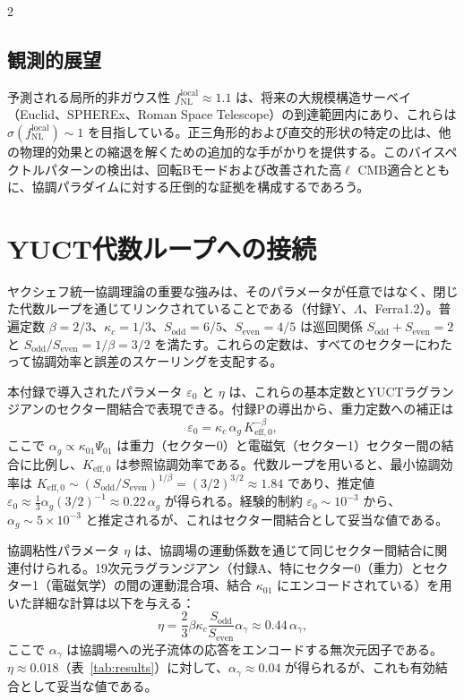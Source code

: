 \documentclass[11pt,a4paper]{article}
\begin{document}
\begin{multicols}{2}
		\subsection{観測的展望}
		予測される局所的非ガウス性 \(f_{\mathrm{NL}}^{\mathrm{local}} \approx 1.1\) は、将来の大規模構造サーベイ（Euclid、SPHEREx、Roman Space Telescope）の到達範囲内にあり、これらは \(\sigma(f_{\mathrm{NL}}^{\mathrm{local}}) \sim 1\) を目指している。正三角形的および直交的形状の特定の比は、他の物理的効果との縮退を解くための追加的な手がかりを提供する。このバイスペクトルパターンの検出は、回転Bモードおよび改善された高\(\ell\) CMB適合とともに、協調パラダイムに対する圧倒的な証拠を構成するであろう。
		
		\section{YUCT代数ループへの接続}
		\label{sec:algebraic}
		
		ヤクシェフ統一協調理論の重要な強みは、そのパラメータが任意ではなく、閉じた代数ループを通じてリンクされていることである（付録Y、\(\Lambda\)、Ferra1.2）。普遍定数 \(\beta=2/3\)、\(\kappa_c=1/3\)、\(S_{\mathrm{odd}}=6/5\)、\(S_{\mathrm{even}}=4/5\) は巡回関係 \(S_{\mathrm{odd}}+S_{\mathrm{even}}=2\) と \(S_{\mathrm{odd}}/S_{\mathrm{even}} = 1/\beta = 3/2\) を満たす。これらの定数は、すべてのセクターにわたって協調効率と誤差のスケーリングを支配する。
		
		本付録で導入されたパラメータ \(\varepsilon_0\) と \(\eta\) は、これらの基本定数とYUCTラグランジアンのセクター間結合で表現できる。付録Pの導出から、重力定数への補正は
		\begin{equation}
			\varepsilon_0 = \kappa_c \, \alpha_g \, K_{\mathrm{eff},0}^{-\beta},
		\end{equation}
		ここで \(\alpha_g \propto \kappa_{01} \Psi_{01}\) は重力（セクター0）と電磁気（セクター1）セクター間の結合に比例し、\(K_{\mathrm{eff},0}\) は参照協調効率である。代数ループを用いると、最小協調効率は \(K_{\mathrm{eff},0} \sim (S_{\mathrm{odd}}/S_{\mathrm{even}})^{1/\beta} = (3/2)^{3/2} \approx 1.84\) であり、推定値 \(\varepsilon_0 \approx \frac{1}{3} \alpha_g (3/2)^{-1} \approx 0.22\,\alpha_g\) が得られる。経験的制約 \(\varepsilon_0 \sim 10^{-3}\) から、\(\alpha_g \sim 5\times10^{-3}\) と推定されるが、これはセクター間結合として妥当な値である。
		
		協調粘性パラメータ \(\eta\) は、協調場の運動係数を通じて同じセクター間結合に関連付けられる。19次元ラグランジアン（付録A、特にセクター0（重力）とセクター1（電磁気学）の間の運動混合項、結合 \(\kappa_{01}\) にエンコードされている）を用いた詳細な計算は以下を与える：
		\begin{equation}
			\eta = \frac{2}{3} \beta \kappa_c \frac{S_{\mathrm{odd}}}{S_{\mathrm{even}}} \alpha_\gamma \approx 0.44 \, \alpha_\gamma,
		\end{equation}
		ここで \(\alpha_\gamma\) は協調場への光子流体の応答をエンコードする無次元因子である。\(\eta \approx 0.018\)（表~\ref{tab:results}）に対して、\(\alpha_\gamma \approx 0.04\) が得られるが、これも有効結合として妥当な値である。
		

\end{multicols}
\end{document}
